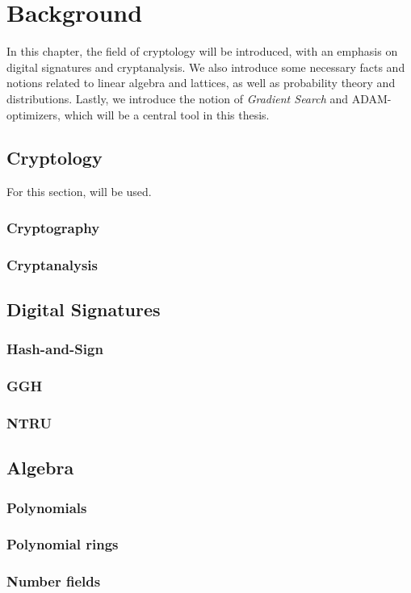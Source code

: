 \chapter{Background}
In this chapter, the field of cryptology will be introduced, with an emphasis on digital signatures and cryptanalysis.  
We also introduce some necessary facts and notions related to linear algebra and lattices, as well as probability theory and distributions.
Lastly, we introduce the notion of \textit{Gradient Search} and ADAM-optimizers, which will be a central tool in this thesis.

\section{Cryptology}
For this section, \cite{KL20} will be used.
\subsection{Cryptography}
\subsection{Cryptanalysis}

\section{Digital Signatures}
\subsection{Hash-and-Sign}
\subsection{GGH}
\subsection{NTRU}
\section{Algebra}
\subsection{Polynomials}
\subsection{Polynomial rings}
\subsection{Number fields}
